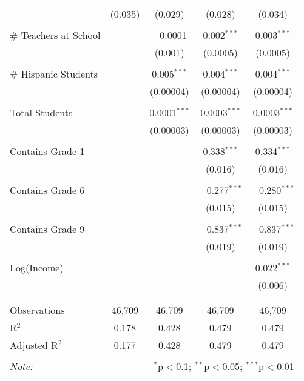 \begin{table}[!htbp]
\begin{tabular}{@{\extracolsep{-2pt}}lcccc}
  & (0.035) & (0.029) & (0.028) & (0.034) \\ 
  & & & & \\ 
 \# Teachers at School &  & $-$0.0001 & 0.002$^{***}$ & 0.003$^{***}$ \\ 
  &  & (0.001) & (0.0005) & (0.0005) \\ 
  & & & & \\ 
 \# Hispanic Students &  & 0.005$^{***}$ & 0.004$^{***}$ & 0.004$^{***}$ \\ 
  &  & (0.00004) & (0.00004) & (0.00004) \\ 
  & & & & \\ 
 Total Students &  & 0.0001$^{***}$ & 0.0003$^{***}$ & 0.0003$^{***}$ \\ 
  &  & (0.00003) & (0.00003) & (0.00003) \\ 
  & & & & \\ 
 Contains Grade 1 &  &  & 0.338$^{***}$ & 0.334$^{***}$ \\ 
  &  &  & (0.016) & (0.016) \\ 
  & & & & \\ 
 Contains Grade 6 &  &  & $-$0.277$^{***}$ & $-$0.280$^{***}$ \\ 
  &  &  & (0.015) & (0.015) \\ 
  & & & & \\ 
 Contains Grade 9 &  &  & $-$0.837$^{***}$ & $-$0.837$^{***}$ \\ 
  &  &  & (0.019) & (0.019) \\ 
  & & & & \\ 
 Log(Income) &  &  &  & 0.022$^{***}$ \\ 
  &  &  &  & (0.006) \\ 
  & & & & \\ 
\hline \\[-1.8ex] 
Observations & 46,709 & 46,709 & 46,709 & 46,709 \\ 
R$^{2}$ & 0.178 & 0.428 & 0.479 & 0.479 \\ 
Adjusted R$^{2}$ & 0.177 & 0.428 & 0.479 & 0.479 \\ 
\hline 
\hline \\[-1.8ex] 
\textit{Note:}  & \multicolumn{4}{r}{$^{*}$p$<$0.1; $^{**}$p$<$0.05; $^{***}$p$<$0.01} \\ 
\end{tabular} 
\end{table} 
